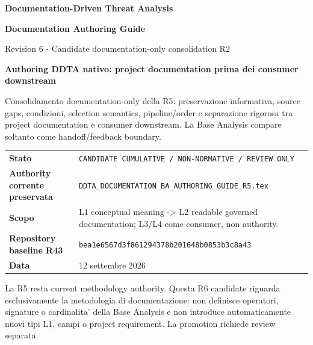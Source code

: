 \documentclass[11pt,a4paper]{article}
\begin{document}

\begin{titlepage}
\thispagestyle{empty}
\vspace*{8mm}
{\sffamily\bfseries\color{DDTANavy}\fontsize{15}{18}\selectfont Documentation-Driven Threat Analysis}\par
\vspace{5mm}
{\sffamily\bfseries\color{DDTANavy}\fontsize{29}{33}\selectfont Documentation Authoring Guide}\par
\vspace{2mm}
{\sffamily\color{DDTABlue}\fontsize{18}{22}\selectfont Revision 6 - Candidate documentation-only consolidation R2}\par
\vspace{9mm}
\begin{tcolorbox}[enhanced,arc=3pt,boxrule=0pt,colback=DDTANavy,left=12pt,right=12pt,top=11pt,bottom=11pt]
{\color{white}\sffamily\bfseries\large Authoring DDTA nativo: project documentation prima dei consumer downstream}\par
\vspace{2mm}
{\color{white!88}\small Consolidamento documentation-only della R5: preservazione informativa, source gaps, condizioni, selection semantics, pipeline/order e separazione rigorosa tra project documentation e consumer downstream. La Base Analysis compare soltanto come handoff/feedback boundary.}
\end{tcolorbox}
\vspace{8mm}
\begin{tabularx}{\textwidth}{L{45mm}Y}
\toprule
\textbf{Stato} & \texttt{CANDIDATE CUMULATIVE / NON-NORMATIVE / REVIEW ONLY} \\
\textbf{Authority corrente preservata} & \nolinkurl{DDTA_DOCUMENTATION_BA_AUTHORING_GUIDE_R5.tex} \\
\textbf{Scopo} & L1 conceptual meaning -> L2 readable governed documentation; L3/L4 come consumer, non authority. \\
\textbf{Repository baseline R43} & \texttt{bea1e6567d3f861294378b201648b0853b3c8a43} \\
\textbf{Data} & 12 settembre 2026 \\
\bottomrule
\end{tabularx}
\vfill
\begin{ddtaopen}[title={Authority stop}]
La R5 resta current methodology authority. Questa R6 candidate riguarda esclusivamente la metodologia di documentazione: non definisce operatori, signature o cardinalita' della Base Analysis e non introduce automaticamente nuovi tipi L1, campi o project requirement. La promotion richiede review separata.
\end{ddtaopen}
\end{titlepage}
\end{document}
